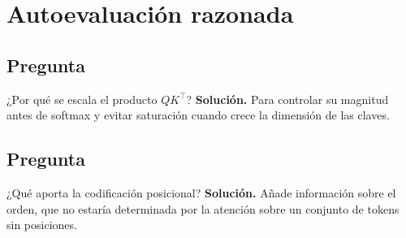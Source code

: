\section{Autoevaluación razonada}

\subsection*{Pregunta} ¿Por qué se escala el producto $QK^\top$?
\textbf{Solución.} Para controlar su magnitud antes de softmax y evitar saturación cuando crece la dimensión de las claves.

\subsection*{Pregunta} ¿Qué aporta la codificación posicional?
\textbf{Solución.} Añade información sobre el orden, que no estaría determinada por la atención sobre un conjunto de tokens sin posiciones.
